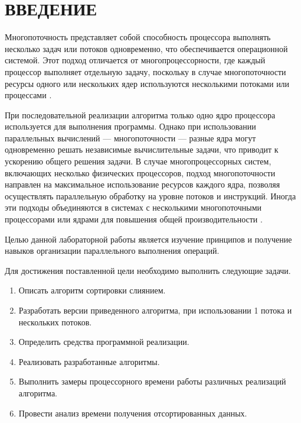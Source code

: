 \chapter*{\hfill{\centering  ВВЕДЕНИЕ}\hfill}

Многопоточность представляет собой способность процессора выполнять несколько задач или потоков одновременно, что обеспечивается операционной системой. Этот подход отличается от многопроцессорности, где каждый процессор выполняет отдельную задачу, поскольку в случае многопоточности ресурсы одного или нескольких ядер используются несколькими потоками или процессами \cite{muti-thread}.

При последовательной реализации алгоритма только одно ядро процессора используется для выполнения программы. Однако при использовании параллельных вычислений --- многопоточности --- разные ядра могут одновременно решать независимые вычислительные задачи, что приводит к ускорению общего решения задачи.
В случае многопроцессорных систем, включающих несколько физических процессоров, подход многопоточности направлен на максимальное использование ресурсов каждого ядра, позволяя осуществлять параллельную обработку на уровне потоков и инструкций. Иногда эти подходы объединяются в системах с несколькими многопоточными процессорами или ядрами для повышения общей производительности \cite{muti-thread}.


Целью данной лабораторной работы является изучение принципов и получение навыков организации параллельного выполнения операций.

Для достижения поставленной цели необходимо выполнить следующие задачи.
\label{sec:targets}
\begin{enumerate}
	\item Описать алгоритм сортировки слиянием.
	\item Разработать версии  приведенного алгоритма, при использовании 1 потока и нескольких потоков.
	\item Определить средства программной реализации.
	\item Реализовать разработанные алгоритмы.
	\item Выполнить замеры процессорного времени работы различных реализаций алгоритма.
	\item Провести анализ времени получения отсортированных данных.
\end{enumerate}